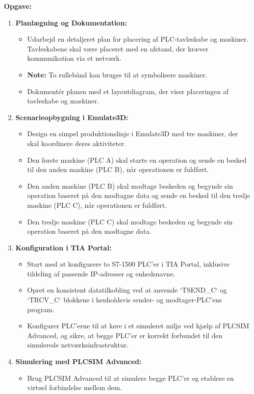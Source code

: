 \textbf{Opgave:}
\begin{enumerate}
	\item \textbf{Planlægning og Dokumentation:}
	\begin{itemize}
		\item Udarbejd en detaljeret plan for placering af PLC-tavleskabe og maskiner. Tavleskabene skal være placeret med en afstand, der kræver kommunikation via et netværk.
		\item \textbf{Note:} To rullebånd kan bruges til at symbolisere maskiner.
		\item Dokumentér planen med et layoutdiagram, der viser placeringen af tavleskabe og maskiner.
	\end{itemize}
	\item \textbf{Scenarieopbygning i Emulate3D:}
	\begin{itemize}
		\item Design en simpel produktionslinje i Emulate3D med tre maskiner, der skal koordinere deres aktiviteter.
		\item Den første maskine (PLC A) skal starte en operation og sende en besked til den anden maskine (PLC B), når operationen er fuldført.
		\item Den anden maskine (PLC B) skal modtage beskeden og begynde sin operation baseret på den modtagne data og sende en besked til den tredje maskine (PLC C), når operationen er fuldført.
		\item Den tredje maskine (PLC C) skal modtage beskeden og begynde sin operation baseret på den modtagne data.
	\end{itemize}
	\item \textbf{Konfiguration i TIA Portal:}
	\begin{itemize}
		\item Start med at konfigurere to S7-1500 PLC'er i TIA Portal, inklusive tildeling af passende IP-adresser og enhedsnavne.
		\item Opret en konsistent datatilkobling ved at anvende `TSEND\_C` og `TRCV\_C` blokkene i henholdsvis sender- og modtager-PLC'ens program.
		\item Konfigurer PLC'erne til at køre i et simuleret miljø ved hjælp af PLCSIM Advanced, og sikre, at begge PLC'er er korrekt forbundet til den simulerede netværksinfrastruktur.
	\end{itemize}
	\item \textbf{Simulering med PLCSIM Advanced:}
	\begin{itemize}
		\item Brug PLCSIM Advanced til at simulere begge PLC'er og etablere en virtuel forbindelse mellem dem.

\end{itemize}
\end{enumerate}
